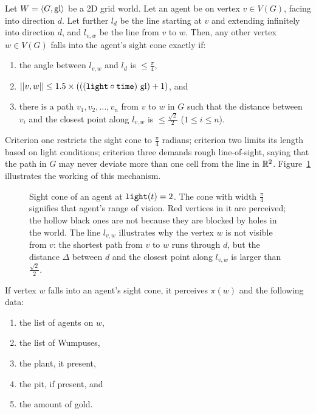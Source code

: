 \begin{definition}
	\label{def:los}
	Let $W = \langle G, \mathrm{gl} \rangle$ be a 2D grid world. Let an agent be on vertex $v \in V(G)$, facing into direction $d$. Let further $l_d$ be the line starting at $v$ and extending infinitely into direction $d$, and $l_{v,w}$ be the line from $v$ to $w$. Then, any other vertex $w \in V(G)$ falls into the agent's sight cone exactly if:
	
	\begin{enumerate}
		\item the angle between $l_{v,w}$ and $l_d$ is $\leq \frac{\pi}{4}$,
		\item $||{v},{w}|| \leq 1.5 \times (((\mathtt{light} \circ \mathtt{time})\ \mathrm{gl}) + 1)$, and
		\item there is a path $v_1, v_2, \dots, v_n$ from $v$ to $w$ in $G$ such that
		the distance between $v_i$ and the closest point along $l_{v,w}$ is $\leq \frac{\sqrt{2}}{2}$ ($1 \leq i \leq n$).
	\end{enumerate}
\end{definition}

Criterion one restricts the sight cone to $\frac{\pi}{4}$ radians; criterion two limits its length based on light conditions; criterion three demands rough line-of-sight, saying that the path in $G$ may never deviate more than one cell from the line in $\mathbb{R}^2$. Figure~\ref{fig:los} illustrates the working of this mechanism.
%
\begin{figure}
	\centering
	
	\caption{Sight cone of an agent at $\mathtt{light}(t) = 2$. The cone with width $\frac{\pi}{4}$ signifies that agent's range of vision. Red vertices in it are perceived; the hollow black ones are not because they are blocked by holes in the world. The line $l_{v,w}$ illustrates why the vertex $w$ is not visible from $v$: the shortest path from $v$ to $w$ runs through $d$, but the distance $\Delta$ between $d$ and the closest point along $l_{v,w}$ is larger than $\frac{\sqrt{2}}{2}$.}
	\label{fig:los}
\end{figure}
%
If vertex $w$ falls into an agent's sight cone, it perceives $\pi(w)$ and the following data:

\begin{enumerate}
	\item the list of agents on $w$,
	\item the list of Wumpuses,
	\item the plant, it present,
	\item the pit, if present, and
	\item the amount of gold.
\end{enumerate}


